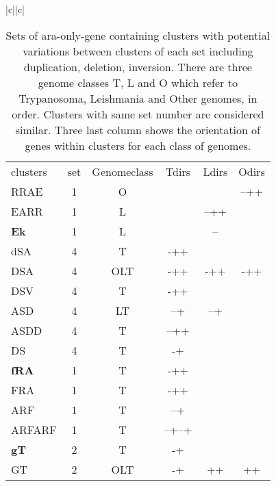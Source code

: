 \documentclass[table,
12pt, %
a4paper, %
oneside, %
headinclude,footinclude, %
BCOR5mm, %
]{scrartcl}
\begin{document}
\begin{table}[htbp]
  \caption{Sets of ara-only-gene containing clusters with potential variations between clusters of each set including duplication, deletion, inversion. There are three genome classes T, L and O which refer to Trypanosoma, Leishmania and Other genomes, in order. Clusters with same set number are considered similar. Three last column shows the orientation of genes within clusters for each class of genomes.}
  \begin{adjustbox}{width=\textwidth,center}
    \begin{tabular}{|c||c|} \hline
      \begin{tabular}{l ccccc}
        clusters     & set & Genomeclass & Tdirs  & Ldirs     & Odirs \\
        \rowcolor{shadecolor}
        RRAE         & 1   & O           &        &           & --++  \\
        EARR         & 1   & L           &        & --++      &       \\
        \textbf{Ek}  & 1   & L           &        & --        &       \\
        \rowcolor{white}
        dSA          & 4   & T           & -++    &           &       \\
        DSA          & 4   & OLT         & -++    & -++       & -++   \\
        DSV          & 4   & T           & -++    &           &       \\
        ASD          & 4   & LT          & --+    & --+       &       \\
        ASDD         & 4   & T           & --++   &           &       \\
        DS           & 4   & T           & -+     &           &       \\
        \rowcolor{shadecolor}
        \textbf{fRA} & 1   & T           & -++    &           &       \\
        FRA          & 1   & T           & -++    &           &       \\
        ARF          & 1   & T           & --+    &           &       \\
        ARFARF       & 1   & T           & --+--+ &           &       \\
        \rowcolor{white}
        \textbf{gT}  & 2   & T           & -+     &           &       \\
        GT           & 2   & OLT         & -+     & ++        & ++    \\

\end{tabular}
\end{tabular}
\end{adjustbox}
\end{table}
\end{document}
